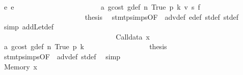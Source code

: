 \begin{isabellebody}
\ {\isacharparenleft}{\kern0pt}e\ e{\isacharparenright}{\kern0pt}\isanewline
\ \ \ \ \ \ \ \ \ \ \ \ \ \ \ \ \ \ \ \ \ \ \isamarkupfalse%
\ a{}\ gcost\ g{\isacharunderscore}{\kern0pt}def\ n{}\ True\ p{}\ k{}\ v{}\ s{}\ f{}\isanewline
\ \ \ \ \ \ \ \ \ \ \ \ \ \ \ \ \ \ \ \ \ \ \isamarkupfalse%
\ {\isacharquery}{\kern0pt}thesis\ \isamarkupfalse%
\ stmt{\isachardot}{\kern0pt}psimps{\isacharparenleft}{\kern0pt}{}{}{\isacharparenright}{\kern0pt}{\isacharbrackleft}{\kern0pt}OF\ {}{}{\isacharparenleft}{\kern0pt}{}{\isacharparenright}{\kern0pt}{\isacharbrackright}{\kern0pt}\ adv{\isacharunderscore}{\kern0pt}def\ e{\isacharprime}{\kern0pt}{\isacharunderscore}{\kern0pt}def\ st{\isacharprime}{\kern0pt}{\isacharunderscore}{\kern0pt}def\ st{\isacharprime}{\kern0pt}{\isacharprime}{\kern0pt}{\isacharunderscore}{\kern0pt}def\ \isamarkupfalse%
\ {\isacharparenleft}{\kern0pt}simp\ add{\isacharcolon}{\kern0pt}Let{\isacharunderscore}{\kern0pt}def{\isacharparenright}{\kern0pt}\isanewline
\ \ \ \ \ \ \ \ \ \ \ \ \ \ \ \ \ \ \ \ \isamarkupfalse%
\isanewline
\ \ \ \ \ \ \ \ \ \ \ \ \ \ \ \ \ \ \isamarkupfalse%
\isanewline
\ \ \ \ \ \ \ \ \ \ \ \ \ \ \ \ \isamarkupfalse%
\isanewline
\ \ \ \ \ \ \ \ \ \ \ \ \ \ \isamarkupfalse%
\isanewline
\ \ \ \ \ \ \ \ \ \ \ \ \ \ \ \ \isamarkupfalse%
\ {\isacharparenleft}{\kern0pt}Calldata\ x{}{\isacharparenright}{\kern0pt}\isanewline
\ \ \ \ \ \ \ \ \ \ \ \ \ \ \ \ \isamarkupfalse%
\ a{}\ gcost\ g{\isacharunderscore}{\kern0pt}def\ n{}\ True\ p{}\ k{}\isanewline
\ \ \ \ \ \ \ \ \ \ \ \ \ \ \ \ \isamarkupfalse%
\ {\isacharquery}{\kern0pt}thesis\ \isamarkupfalse%
\ stmt{\isachardot}{\kern0pt}psimps{\isacharparenleft}{\kern0pt}{}{}{\isacharparenright}{\kern0pt}{\isacharbrackleft}{\kern0pt}OF\ {}{}{\isacharparenleft}{\kern0pt}{}{\isacharparenright}{\kern0pt}{\isacharbrackright}{\kern0pt}\ adv{\isacharunderscore}{\kern0pt}def\ st{\isacharprime}{\kern0pt}{\isacharunderscore}{\kern0pt}def\ \isamarkupfalse%
\ simp\isanewline
\ \ \ \ \ \ \ \ \ \ \ \ \ \ \isamarkupfalse%
\isanewline
\ \ \ \ \ \ \ \ \ \ \ \ \ \ \ \ \isamarkupfalse%
\ {\isacharparenleft}{\kern0pt}Memory\ x{}{\isacharparenright}{\kern0pt}\isanewline

\end{isabellebody}
